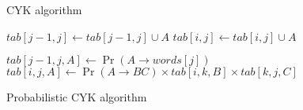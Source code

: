 \documentclass[8pt]{extarticle}
\begin{document}
\begin{figure}
  \centering
  \begin{minipage}{.5\textwidth}
    \begin{algorithm}[H]
      \small
      \caption{CYK algorithm}
      \begin{algorithmic}[1]
            \State $tab[j-1,j] \gets tab[j-1,j] \cup A$
          \EndFor
                \State $tab[i,j] \gets tab[i,j] \cup A$
              \EndFor
            \EndFor
          \EndFor
        \EndFor
      \end{algorithmic}
    \end{algorithm}
  \end{minipage}%
  \begin{minipage}{.5\textwidth}
    \begin{algorithm}[H]
      \small
      \caption{Probabilistic CYK algorithm}
      \begin{algorithmic}[1]
          \State $tab[j-1,j, A] \gets \Pr(A \rightarrow words[j])$
          \EndFor
                  \State $tab[i,j,A] \gets \Pr(A \rightarrow BC) \times tab[i,k,B] \times tab[k,j,C]$
                \EndIf
              \EndFor
            \EndFor
          \EndFor
        \EndFor
      \end{algorithmic}
    \end{algorithm}
  \end{minipage}
\end{figure}
\end{document}
